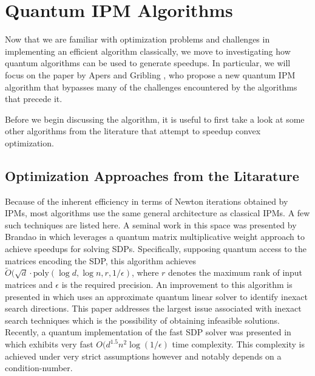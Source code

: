 \documentclass[11pt]{article}
\begin{document}
\section{Quantum IPM Algorithms} 
 
	Now that we are familiar with optimization problems and challenges in implementing an efficient algorithm classically, 
	we move to investigating how quantum algorithms can be used to generate speedups. In 
	particular, we will focus on the paper by Apers and Gribling \cite{apersQuantumSpeedupsLinear2024}, who propose a new quantum IPM algorithm that 
	bypasses many of the challenges encountered by the algorithms that precede it. 

 
 Before we begin discussing the algorithm, it is useful to first take a look at some other algorithms from the literature that attempt to speedup convex optimization.


 \subsection{Optimization Approaches from the Litarature}
 \label{Other Optimizations}
 Because of the inherent efficiency in terms of Newton iterations obtained by IPMs, most algorithms use the same general architecture as classical IPMs. A few such techniques are listed here.
 A seminal work in this space was presented by Brandao in \cite{brandaoQuantumSDPSolvers2019} which leverages a quantum matrix multiplicative weight approach to achieve speedups for solving SDPs. Specifically, supposing quantum access to the matrices encoding the SDP, this algorithm achieves  \( \widetilde
O(\sqrt{d}\cdot \text{poly}(\log d, \log n, r, 1/\epsilon)\), where $r$ denotes the maximum rank of input matrices and $\epsilon$ is the required precision. An improvement to this algorithm is presented in \cite{wuInexactFeasibleQuantum2023} which uses an approximate quantum linear solver to identify inexact search directions. This paper addresses the largest issue associated with inexact search techniques which is the possibility of obtaining infeasible solutions.  Recently,  a quantum implementation of the fast SDP solver \cite{huangFasterQuantumAlgorithm2023} was presented in \cite{huangSolvingSDPFaster2021} which exhibits very fast $O(d^{1.5}n^2 \log(1/\epsilon)$ time complexity. This complexity is achieved under very strict assumptions however and notably depends on a condition-number. 
\end{document}
